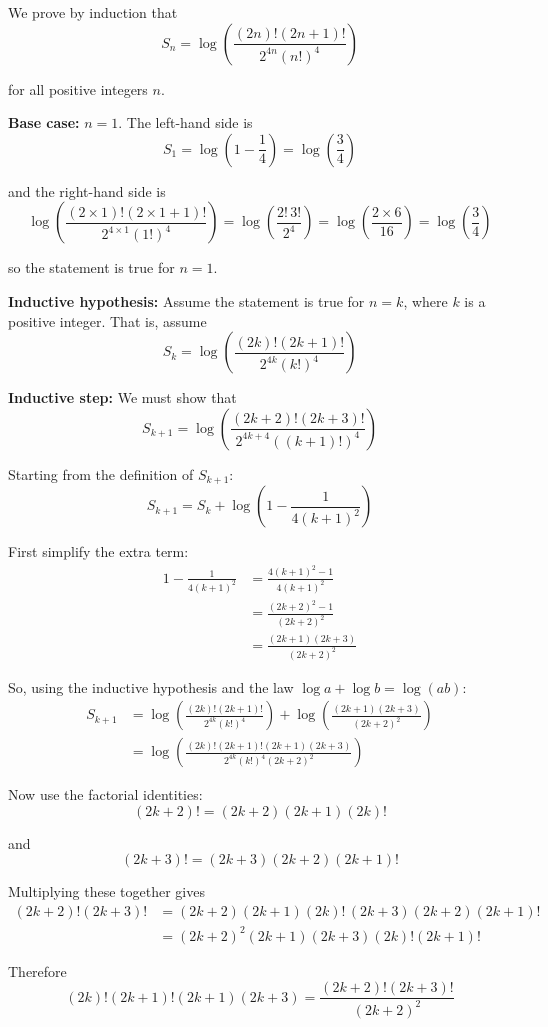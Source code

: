 \documentclass[leqno]{article}
\begin{document}
\begin{enumerate}[
  label=\textbf{\arabic*.},
  leftmargin=*,
  topsep=0pt,
  partopsep=0pt,
  parsep=0pt
]
\begin{djsSolution}
We prove by induction that
\[
S_n=\log\left(\frac{(2n)!(2n+1)!}{2^{4n}(n!)^4}\right)
\]

for all positive integers \(n\).

\textbf{Base case:} \(n=1\). The left-hand side is
\[
S_1=\log\left(1-\frac14\right)=\log\left(\frac34\right)
\]

and the right-hand side is
\[
\log\left(\frac{(2\times1)!(2\times1+1)!}{2^{4\times1}(1!)^4}\right)
=\log\left(\frac{2!\,3!}{2^4}\right)
=\log\left(\frac{2\times6}{16}\right)
=\log\left(\frac34\right)
\]

so the statement is true for \(n=1\).

\textbf{Inductive hypothesis:} Assume the statement is true for \(n=k\), where \(k\) is a positive integer. That is, assume
\[
S_k=\log\left(\frac{(2k)!(2k+1)!}{2^{4k}(k!)^4}\right)
\]

\textbf{Inductive step:} We must show that
\[
S_{k+1}=\log\left(\frac{(2k+2)!(2k+3)!}{2^{4k+4}((k+1)!)^4}\right)
\]

Starting from the definition of \(S_{k+1}\):
\[
S_{k+1}=S_k+\log\left(1-\frac{1}{4(k+1)^2}\right)
\]

First simplify the extra term:
\begin{align*}
1-\frac{1}{4(k+1)^2}
&=\frac{4(k+1)^2-1}{4(k+1)^2} \\
&=\frac{(2k+2)^2-1}{(2k+2)^2} \\
&=\frac{(2k+1)(2k+3)}{(2k+2)^2}
\end{align*}

So, using the inductive hypothesis and the law \(\log a+\log b=\log(ab)\):
\begin{align*}
S_{k+1}
&=\log\left(\frac{(2k)!(2k+1)!}{2^{4k}(k!)^4}\right)
+\log\left(\frac{(2k+1)(2k+3)}{(2k+2)^2}\right) \\
&=\log\left(\frac{(2k)!(2k+1)!(2k+1)(2k+3)}{2^{4k}(k!)^4(2k+2)^2}\right)
\end{align*}

Now use the factorial identities:
\[
(2k+2)!=(2k+2)(2k+1)(2k)!
\]

and
\[
(2k+3)!=(2k+3)(2k+2)(2k+1)!
\]

Multiplying these together gives
\begin{align*}
(2k+2)!(2k+3)!
&=(2k+2)(2k+1)(2k)!\,(2k+3)(2k+2)(2k+1)! \\
&=(2k+2)^2(2k+1)(2k+3)(2k)!(2k+1)!
\end{align*}

Therefore
\[
(2k)!(2k+1)!(2k+1)(2k+3)=\frac{(2k+2)!(2k+3)!}{(2k+2)^2}
\]


\end{djsSolution}
\end{enumerate}
\end{document}
